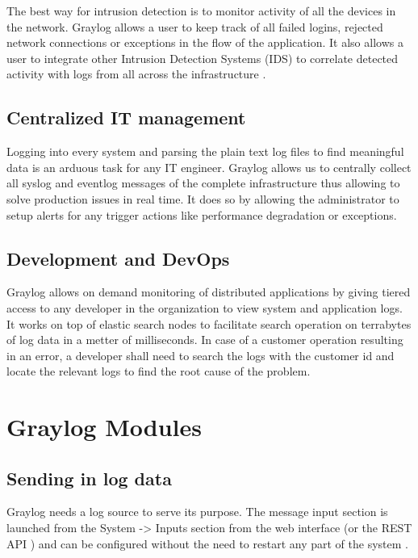 \documentclass[9pt,twocolumn,twoside]{../../styles/osajnl}
\begin{document}
The best way for intrusion detection is to monitor activity of all the
devices in the network.  Graylog allows a user to keep track of all
failed logins, rejected network connections or exceptions in the flow
of the application. It also allows a user to integrate other Intrusion
Detection Systems (IDS) to correlate detected activity with logs from
all across the infrastructure \cite{www-graylog-org}.

\subsection{Centralized IT management}

Logging into every system and parsing the plain text log files to find
meaningful data is an arduous task for any IT engineer. Graylog allows
us to centrally collect all syslog and eventlog messages of the
complete infrastructure thus allowing to solve production issues in
real time. It does so by allowing the administrator to setup alerts
for any trigger actions like performance degradation or exceptions.

\subsection{Development and DevOps}

Graylog allows on demand monitoring of distributed applications by
giving tiered access to any developer in the organization to view
system and application logs. It works on top of elastic search nodes
to facilitate search operation on terrabytes \SE of log data in a metter \SE
of milliseconds. In case of a customer operation resulting in an
error, a developer shall need to search the logs with the customer id
and locate the relevant logs to find the root cause of the problem.

\section{Graylog Modules}


\subsection{Sending in log data}

Graylog needs a log source to serve its purpose. The message input
section is launched from the System -> Inputs
 section from the web
interface (or the REST API \CE) and can be configured without the need to
restart any part of the system \cite{www-graylog-sending_data}.
\end{document}

